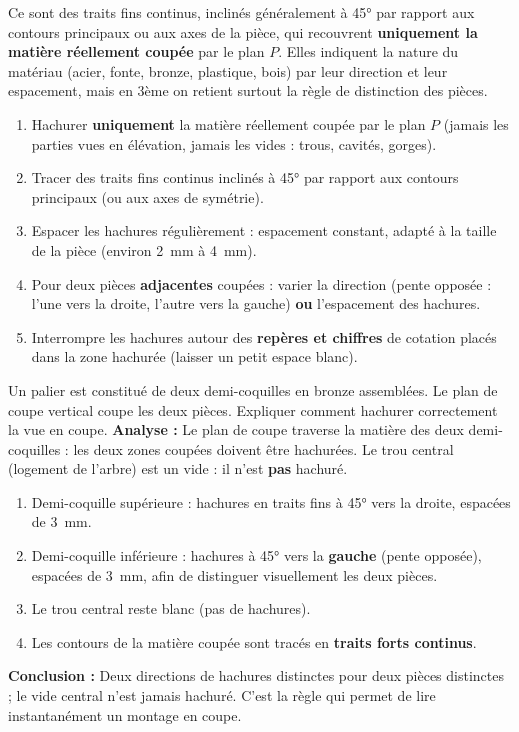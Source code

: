 \documentclass[11pt]{article}
\newcommand{\cle}[1]{{\popxbold\color{popdark}#1}}
\newcounter{popsec}
\newcounter{popsub}
\newcommand{\courssub}[1]{%
  \stepcounter{popsub}%
  \par\vspace{9pt}\noindent{\popxbold\fontsize{11.5}{13}\selectfont\color{popink}{\color{poporange}\thepopsec.\thepopsub}\hspace{6pt}#1}\par\nopagebreak\vspace{4pt}
}
\begin{document}
\courssub{Les hachures : règles et conventions}

\begin{definition}[Hachures]
Ce sont des traits fins continus, inclinés généralement à \ang{45} par rapport aux contours principaux ou aux axes de la pièce, qui recouvrent \textbf{uniquement la matière réellement coupée} par le plan $P$. Elles indiquent la nature du matériau (acier, fonte, bronze, plastique, bois) par leur direction et leur espacement, mais en 3ème on retient surtout la règle de distinction des pièces.
\end{definition}

\begin{methode}
\begin{enumerate}
\item Hachurer \textbf{uniquement} la matière réellement coupée par le plan $P$ (jamais les parties vues en élévation, jamais les vides : trous, cavités, gorges).
\item Tracer des \cle{traits fins continus} inclinés à \ang{45} par rapport aux contours principaux (ou aux axes de symétrie).
\item Espacer les hachures régulièrement : espacement constant, adapté à la taille de la pièce (environ \SI{2}{mm} à \SI{4}{mm}).
\item Pour deux pièces \textbf{adjacentes} coupées : varier la direction (pente opposée : l'une vers la droite, l'autre vers la gauche) \textbf{ou} l'espacement des hachures.
\item Interrompre les hachures autour des \textbf{repères et chiffres} de cotation placés dans la zone hachurée (laisser un petit espace blanc).
\end{enumerate}
\end{methode}

\begin{exoresolu}
Un palier est constitué de deux demi-coquilles en bronze assemblées. Le plan de coupe vertical coupe les deux pièces. Expliquer comment hachurer correctement la vue en coupe.
\tcblower
\textbf{Analyse :} Le plan de coupe traverse la matière des deux demi-coquilles : les deux zones coupées doivent être hachurées. Le trou central (logement de l'arbre) est un vide : il n'est \textbf{pas} hachuré.
\begin{enumerate}
\item Demi-coquille supérieure : hachures en traits fins à \ang{45} vers la droite, espacées de \SI{3}{mm}.
\item Demi-coquille inférieure : hachures à \ang{45} vers la \textbf{gauche} (pente opposée), espacées de \SI{3}{mm}, afin de distinguer visuellement les deux pièces.
\item Le trou central reste blanc (pas de hachures).
\item Les contours de la matière coupée sont tracés en \textbf{traits forts continus}.
\end{enumerate}
\textbf{Conclusion :} Deux directions de hachures distinctes pour deux pièces distinctes ; le vide central n'est jamais hachuré. C'est la règle qui permet de lire instantanément un montage en coupe.
\end{exoresolu}
\end{document}
